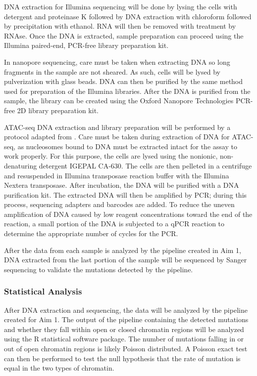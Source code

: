 DNA extraction for Illumina sequencing will be done by lysing the cells with detergent and proteinase K followed by DNA extraction with chloroform followed by precipitation with ethanol. RNA will then be removed with treatment by RNAse. Once the DNA is extracted, sample preparation can proceed using the Illumina paired-end, PCR-free library preparation kit.

In nanopore sequencing, care must be taken when extracting DNA so long fragments in the sample are not sheared. As such, cells will be lysed by pulverization with glass beads. DNA can then be purified by the same method used for preparation of the Illumina libraries. After the DNA is purified from the sample, the library can be created using the Oxford Nanopore Technologies PCR-free 2D library preparation kit. 

ATAC-seq DNA extraction and library preparation will be performed by a protocol adapted from \cite{buenrostro_atac-seq:_2015}.
Care must be taken during extraction of DNA for ATAC-seq, as nucleosomes bound to DNA must be extracted intact for the assay to work properly. For this purpose, the cells are lysed using the nonionic, non-denaturing detergent IGEPAL CA-630. The cells are then pelleted in a centrifuge and resuspended in Illumina transposase reaction buffer with the Illumina Nextera transposase. After incubation, the DNA will be purified with a DNA purification kit. The extracted DNA will then be amplified by PCR; during this process, sequencing adapters and barcodes are added. To reduce the uneven amplification of DNA caused by low reagent concentrations toward the end of the reaction, a small portion of the DNA is subjected to a qPCR reaction to determine the appropriate number of cycles for the PCR.

After the data from each sample is analyzed by the pipeline created in Aim 1, DNA extracted from the last portion of the sample will be sequenced by Sanger sequencing to validate the mutations detected by the pipeline.

\subsubsection{Statistical Analysis}

After DNA extraction and sequencing, the data will be analyzed by the pipeline created for Aim 1. The output of the pipeline containing the detected mutations and whether they fall within open or closed chromatin regions will be analyzed using the R statistical software package.
The number of mutations falling in or out of open chromatin regions is likely Poisson distributed. A Poisson exact test can then be performed to test the null hypothesis that the rate of mutation is equal in the two types of chromatin.

